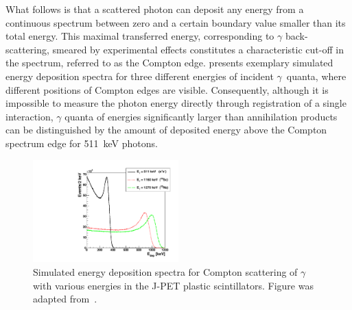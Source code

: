 What follows is that a scattered photon can deposit any energy from a continuous spectrum between zero and a certain boundary value smaller than its total energy. This maximal transferred energy, corresponding to $\gamma$ back-scattering, smeared by experimental effects constitutes a characteristic cut-off in the spectrum, referred to as the Compton edge.  presents exemplary simulated energy deposition spectra for three different energies of incident $\gamma$~quanta, where different positions of Compton edges are visible. Consequently, although it is impossible to measure the photon energy directly through registration of a single interaction, $\gamma$ quanta of energies significantly larger than annihilation products can be distinguished by the amount of deposited energy above the Compton spectrum edge for 511~keV photons.

\begin{figure}[h!]
  \centering
  \includegraphics[width=0.5\textwidth]{Chapter3_detectors/img/compton}
  \caption{Simulated energy deposition spectra for Compton scattering of $\gamma$ with various energies in the J-PET plastic scintillators. Figure was adapted from~\cite{daria_epjc}.}
  \label{fig:compton}
\end{figure}

